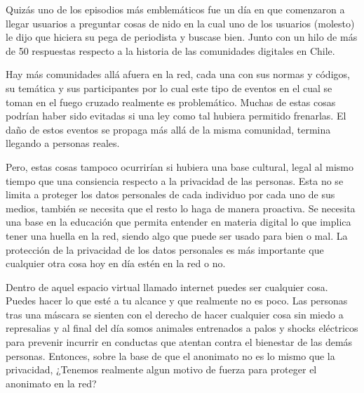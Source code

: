 \documentclass[11pt]{utalcaDoc}
\begin{document}
Quizás uno de los episodios más emblemáticos fue un día en que comenzaron a llegar usuarios a preguntar cosas de nido en la cual uno de los usuarios (molesto) le dijo que hiciera su pega de periodista y buscase bien. Junto con un hilo de más de 50 respuestas respecto a la historia de las comunidades digitales en Chile.

Hay más comunidades allá afuera en la red, cada una con sus normas y códigos, su temática y sus participantes por lo cual este tipo de eventos en el cual se toman en el fuego cruzado realmente es problemático. Muchas de estas cosas podrían haber sido evitadas si una ley como tal hubiera permitido frenarlas. El daño de estos eventos se propaga más allá de la misma comunidad, termina llegando a personas reales.

Pero, estas cosas tampoco ocurrirían si hubiera una base cultural, legal al mismo tiempo que una consiencia respecto a la privacidad de las personas. Esta no se limita a proteger los datos personales de cada individuo por cada uno de sus medios, también se necesita que el resto lo haga de manera proactiva. Se necesita una base en la educación que permita entender en materia digital lo que implica tener una huella en la red, siendo algo que puede ser usado para bien o mal. La protección de la privacidad de los datos personales es más importante que cualquier otra cosa hoy en día estén en la red o no.

Dentro de aquel espacio virtual llamado internet puedes ser cualquier cosa. Puedes hacer lo que esté a tu alcance y que realmente no es poco. Las personas tras una máscara se sienten con el derecho de hacer cualquier cosa sin miedo a represalias y al final del día somos animales entrenados a palos y shocks eléctricos para prevenir incurrir en conductas que atentan contra el bienestar de las demás personas. Entonces, sobre la base de que el anonimato no es lo mismo que la privacidad, ¿Tenemos realmente algun motivo de fuerza para proteger el anonimato en la red?
\end{document}

